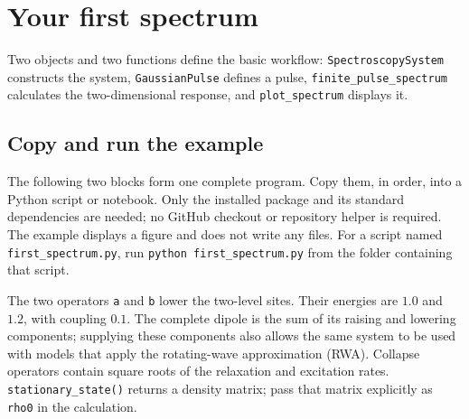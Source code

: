 \section{Your first spectrum}
\label{sec:quickstart}

Two objects and two functions define the basic workflow: \texttt{SpectroscopySystem}
constructs the system, \texttt{GaussianPulse} defines a pulse,
\texttt{finite\_pulse\_spectrum} calculates the two-dimensional response,
and \texttt{plot\_spectrum} displays it.

\subsection{Copy and run the example}

The following two blocks form one complete program. Copy them, in order,
into a Python script or notebook. Only the installed package and its
standard dependencies are needed; no GitHub checkout or repository helper
is required. The example displays a figure and does not write any files.
For a script named \texttt{first\_spectrum.py}, run
\texttt{python first\_spectrum.py} from the folder containing that script.

\par\noindent
\begin{minipage}{\linewidth}

\end{minipage}\par

The two operators \texttt{a} and \texttt{b} lower the two-level sites.
Their energies are $1.0$ and $1.2$, with coupling $0.1$. The complete dipole
is the sum of its raising and lowering components; supplying these
components also allows the same system to be used with models that apply
the rotating-wave approximation (RWA).
Collapse operators contain square roots of the relaxation and excitation
rates. \texttt{stationary\_state()} returns a density matrix; pass that
matrix explicitly as \texttt{rho0} in the calculation.

\par\noindent
\begin{minipage}{\linewidth}

\end{minipage}\par

